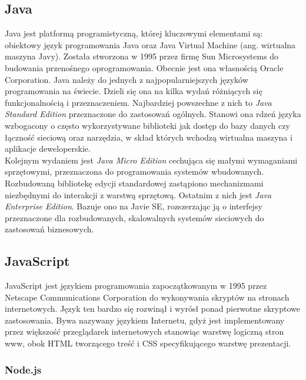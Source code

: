 \documentclass[12pt,twoside]{article}
\begin{document}
\subsection{Java}\label{technologie---java}

Java jest platformą programistyczną, której kluczowymi elementami są:
obiektowy język programowania Java oraz Java Virtual Machine (ang.
wirtualna maszyna Javy). Została stworzona w 1995 przez firmę Sun
Microsystems do budowania przenośnego oprogramowania. Obecnie jest ona
własnością Oracle Corporation. Java należy do jednych z
najpopularniejszych języków programowania na
świecie\autocite{tiobe2015index}. Dzieli się ona na kilka wydań
różniących się funkcjonalnością i przeznaczeniem. Najbardziej powszechne
z nich to \emph{Java Standard Edition} przeznaczone do zastosowań
ogólnych. Stanowi ona rdzeń języka wzbogacony o często wykorzystywane
biblioteki jak dostęp do bazy danych czy łączność sieciową oraz
narzędzia, w skład których wchodzą wirtualna maszyna i aplikacje
deweloperskie.\\
Kolejnym wydaniem jest \emph{Java Micro Edition} cechująca się małymi
wymaganiami sprzętowymi, przeznaczona do programowania systemów
wbudowanych. Rozbudowaną bibliotekę edycji standardowej zastąpiono
mechanizmami niezbędnymi do interakcji z warstwą sprzętową. Ostatnim z
nich jest \emph{Java Enterprise Edition}. Bazuje ono na Javie SE,
rozszerzając ją o interfejsy przeznaczone dla rozbudowanych,
skalowalnych systemów sieciowych do zastosowań
biznesowych.\autocite{jendrock2014jee}

\subsection{JavaScript}\label{javascript}

JavaScript jest językiem programowania zapoczątkowanym w 1995 przez
Netscape Communications Corporation do wykonywania skryptów na stronach
internetowych. Język ten bardzo się rozwinął i wyrósł ponad pierwotne
skryptowe zastosowania. Bywa nazywany językiem Internetu, gdyż jest
implementowany przez większość przeglądarek internetowych stanowiąc
warstwę logiczną stron www, obok HTML tworzącego treść i CSS
specyfikującego warstwę prezentacji.\autocite{flanagan2006javascript}

\subsubsection{Node.js}\label{node.js}
\end{document}
